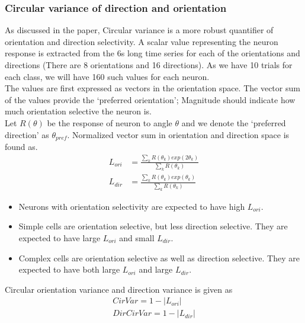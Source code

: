\documentclass[11pt]{article}
\begin{document}
\subsubsection{Circular variance of direction and orientation} %
\label{ssub:circular_variance_of_direction_and_orientation}
As discussed in the paper, Circular variance is a more robust quantifier of orientation and direction selectivity. A scalar value representing the neuron response is extracted from the 6s long time series for each of the orientations and directions (There are 8 orientations and 16 directions). As we have 10 trials for each class, we will have 160 such values for each neuron.\\
The values are first expressed as vectors in the orientation space. The vector sum of the values provide the `preferred orientation'; Magnitude should indicate how much orientation selective the neuron is.\\
Let $R(\theta)$ be the response of neuron to angle $\theta$ and we denote the `preferred direction' as $\theta_{pref}$.
Normalized vector sum in orientation and direction space is found as.
\begin{align}
    L_{ori} &= \frac{\sum_{k} R(\theta_k) exp(2\theta_k)}{\sum_{k} R(\theta_k)}\\
    L_{dir} &= \frac{\sum_{k} R(\theta_k) exp(\theta_k)}{\sum_{k} R(\theta_k)}
\end{align}
\begin{itemize}
    \item Neurons with orientation selectivity are expected to have high $L_{ori}$.
    \item Simple cells are orientation selective, but less direction selective. They are expected to have large $L_{ori}$ and small $L_{dir}$.
    \item Complex cells are orientation selective as well as direction selective. They are expected to have both large $L_{ori}$ and large $L_{dir}$.
\end{itemize}
Circular orientation variance and direction variance is given as
\begin{align}
    CirVar = 1 - |L_{ori}|\\
    DirCirVar = 1- |L_{dir}|
\end{align}








\newpage

% 

\end{document}
